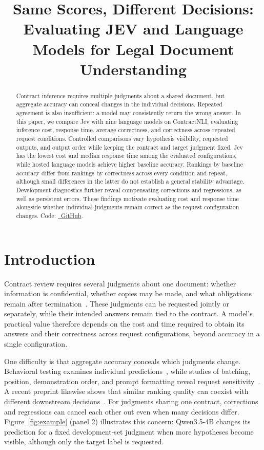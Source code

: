 \documentclass{article}
\title{Same Scores, Different Decisions: Evaluating JEV and Language Models for Legal Document Understanding}
\begin{document}
\maketitle
\suppressfloats[t]

\begin{abstract}
Contract inference requires multiple judgments about a shared document, but aggregate accuracy can conceal changes in the individual decisions. Repeated agreement is also insufficient: a model may consistently return the wrong answer. In this paper, we compare Jev with nine language models on ContractNLI, evaluating inference cost, response time, average correctness, and correctness across repeated request conditions. Controlled comparisons vary hypothesis visibility, requested outputs, and output order while keeping the contract and target judgment fixed. Jev has the lowest cost and median response time among the evaluated configurations, while hosted language models achieve higher baseline accuracy. Rankings by baseline accuracy differ from rankings by correctness across every condition and repeat, although small differences in the latter do not establish a general stability advantage. Development diagnostics further reveal compensating corrections and regressions, as well as persistent errors. These findings motivate evaluating cost and response time alongside whether individual judgments remain correct as the request configuration changes. Code:
\href{https://github.com/ZF-Utokyo/Jev-Benchmark}{\faGithub\ GitHub}.
\end{abstract}

\section{Introduction}
Contract review requires several judgments about one document: whether information is confidential, whether copies may be made, and what obligations remain after termination~\citep{koreeda2021contractnli,hendrycks2021cuad}. These judgments can be requested jointly or separately, while their intended answers remain tied to the contract. A model's practical value therefore depends on the cost and time required to obtain its answers and their correctness across request configurations, beyond accuracy in a single configuration.

One difficulty is that aggregate accuracy conceals which judgments change. Behavioral testing examines individual predictions~\citep{ribeiro2020checklist}, while studies of batching, position, demonstration order, and prompt formatting reveal request sensitivity~\citep{lin2024batchprompt,lu2022fantastically,sclar2024quantifying}. A recent preprint likewise shows that similar ranking quality can coexist with different downstream decisions~\citep{frohmann2026equal}. For judgments sharing one contract, corrections and regressions can cancel each other out even when many decisions differ. Figure~\ref{fig:example} (panel 2) illustrates this concern: Qwen3.5-4B changes its prediction for a fixed development-set judgment when more hypotheses become visible, although only the target label is requested.
\end{document}

